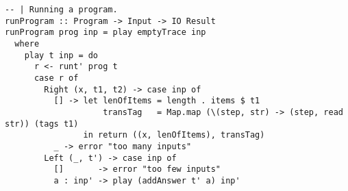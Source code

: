 \documentclass[10pt]{article}
\begin{document}
\begin{lstlisting}
-- | Running a program.                                                                                                                                                                       
runProgram :: Program -> Input -> IO Result                                                                                                                                                   
runProgram prog inp = play emptyTrace inp                                                                                                                                                     
  where                                                                                                                                                                                       
    play t inp = do                                                                                                                                                                           
      r <- runt' prog t                                                                                                                                                                       
      case r of                                                                                                                                                                               
        Right (x, t1, t2) -> case inp of                                                                                                                                                      
          [] -> let lenOfItems = length . items $ t1                                                                                                                                          
                    transTag   = Map.map (\(step, str) -> (step, read str)) (tags t1)                                                                                                         
                in return ((x, lenOfItems), transTag)                                                                                                                                         
          _ -> error "too many inputs"                                                                                                                                                        
        Left (_, t') -> case inp of                                                                                                                                                           
          []       -> error "too few inputs"                                                                                                                                                  
          a : inp' -> play (addAnswer t' a) inp' 
          

\end{lstlisting}
\end{document}
